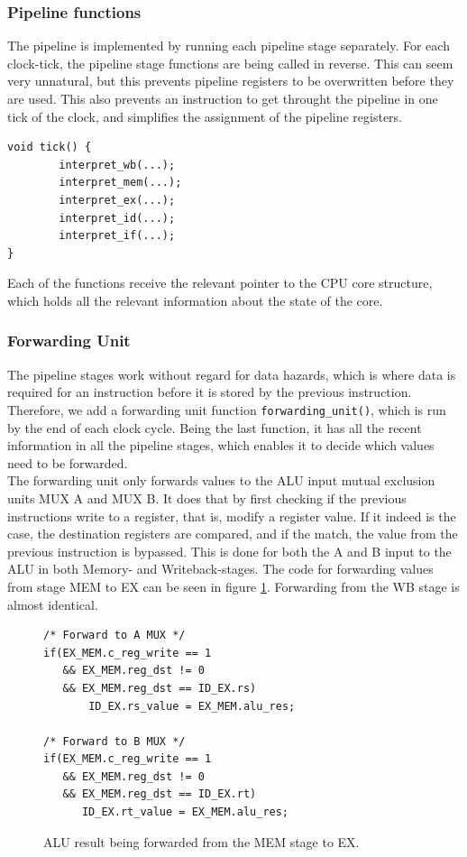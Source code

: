 \subsubsection{Pipeline functions}
The pipeline is implemented by running each pipeline stage separately. For each
clock-tick, the pipeline stage functions are being called in reverse. This can
seem very unnatural, but this prevents pipeline registers to be overwritten
before they are used. This also prevents an instruction to get throught the
pipeline in one tick of the clock, and simplifies the assignment of the pipeline
registers.
\begin{verbatim}
void tick() {
        interpret_wb(...);
        interpret_mem(...);
        interpret_ex(...);
        interpret_id(...);
        interpret_if(...);
}
\end{verbatim}

Each of the functions receive the relevant pointer to the CPU core structure,
which holds all the relevant information about the state of the core.


\subsubsection{Forwarding Unit}
The pipeline stages work without regard for data hazards, which is where data
is required for an instruction before it is stored by the previous instruction.
Therefore, we add a forwarding unit function \texttt{forwarding\_unit()}, which
is run by the end of each clock cycle. Being the last function, it has all the
recent information in all the pipeline stages, which enables it to decide which
values need to be forwarded.\\
The forwarding unit only forwards values to the ALU input mutual exclusion
units MUX A and MUX B. It does that by first checking if the previous
instructions write to a register, that is, modify a register value. If it
indeed is the case, the destination registers are compared, and if the match,
the value from the previous instruction is bypassed. This is done for both the
A and B input to the ALU in both Memory- and Writeback-stages. The code for
forwarding values from stage MEM to EX can be seen in figure
\ref{fig:forwarding_unit_code}. Forwarding from the WB stage is almost
identical.

\begin{figure}[H]
\centering
\begin{lstlisting}[style=customc]
/* Forward to A MUX */
if(EX_MEM.c_reg_write == 1
   && EX_MEM.reg_dst != 0
   && EX_MEM.reg_dst == ID_EX.rs)
       ID_EX.rs_value = EX_MEM.alu_res;

/* Forward to B MUX */
if(EX_MEM.c_reg_write == 1
   && EX_MEM.reg_dst != 0
   && EX_MEM.reg_dst == ID_EX.rt)
      ID_EX.rt_value = EX_MEM.alu_res;
\end{lstlisting}
\caption{ALU result being forwarded from the MEM stage to EX.}
\label{fig:forwarding_unit_code}
\end{figure}

